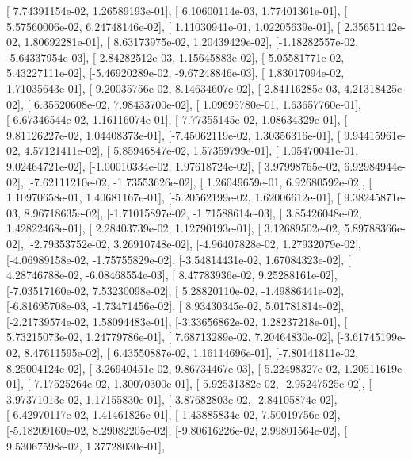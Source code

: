 \documentclass{article}
\begin{document}
       [ 7.74391154e-02,  1.26589193e-01],
       [ 6.10600114e-03,  1.77401361e-01],
       [ 5.57560006e-02,  6.24748146e-02],
       [ 1.11030941e-01,  1.02205639e-01],
       [ 2.35651142e-02,  1.80692281e-01],
       [ 8.63173975e-02,  1.20439429e-02],
       [-1.18282557e-02, -5.64337954e-03],
       [-2.84282512e-03,  1.15645883e-02],
       [-5.05581771e-02,  5.43227111e-02],
       [-5.46920289e-02, -9.67248846e-03],
       [ 1.83017094e-02,  1.71035643e-01],
       [ 9.20035756e-02,  8.14634607e-02],
       [ 2.84116285e-03,  4.21318425e-02],
       [ 6.35520608e-02,  7.98433700e-02],
       [ 1.09695780e-01,  1.63657760e-01],
       [-6.67346544e-02,  1.16116074e-01],
       [ 7.77355145e-02,  1.08634329e-01],
       [ 9.81126227e-02,  1.04408373e-01],
       [-7.45062119e-02,  1.30356316e-01],
       [ 9.94415961e-02,  4.57121411e-02],
       [ 5.85946847e-02,  1.57359799e-01],
       [ 1.05470041e-01,  9.02464721e-02],
       [-1.00010334e-02,  1.97618724e-02],
       [ 3.97998765e-02,  6.92984944e-02],
       [-7.62111210e-02, -1.73553626e-02],
       [ 1.26049659e-01,  6.92680592e-02],
       [ 1.10970658e-01,  1.40681167e-01],
       [-5.20562199e-02,  1.62006612e-01],
       [ 9.38245871e-03,  8.96718635e-02],
       [-1.71015897e-02, -1.71588614e-03],
       [ 3.85426048e-02,  1.42822468e-01],
       [ 2.28403739e-02,  1.12790193e-01],
       [ 3.12689502e-02,  5.89788366e-02],
       [-2.79353752e-02,  3.26910748e-02],
       [-4.96407828e-02,  1.27932079e-02],
       [-4.06989158e-02, -1.75755829e-02],
       [-3.54814431e-02,  1.67084323e-02],
       [ 4.28746788e-02, -6.08468554e-03],
       [ 8.47783936e-02,  9.25288161e-02],
       [-7.03517160e-02,  7.53230098e-02],
       [ 5.28820110e-02, -1.49886441e-02],
       [-6.81695708e-03, -1.73471456e-02],
       [ 8.93430345e-02,  5.01781814e-02],
       [-2.21739574e-02,  1.58094483e-01],
       [-3.33656862e-02,  1.28237218e-01],
       [ 5.73215073e-02,  1.24779786e-01],
       [ 7.68713289e-02,  7.20464830e-02],
       [-3.61745199e-02,  8.47611595e-02],
       [ 6.43550887e-02,  1.16114696e-01],
       [-7.80141811e-02,  8.25004124e-02],
       [ 3.26940451e-02,  9.86734467e-03],
       [ 5.22498327e-02,  1.20511619e-01],
       [ 7.17525264e-02,  1.30070300e-01],
       [ 5.92531382e-02, -2.95247525e-02],
       [ 3.97371013e-02,  1.17155830e-01],
       [-3.87682803e-02, -2.84105874e-02],
       [-6.42970117e-02,  1.41461826e-01],
       [ 1.43885834e-02,  7.50019756e-02],
       [-5.18209160e-02,  8.29082205e-02],
       [-9.80616226e-02,  2.99801564e-02],
       [ 9.53067598e-02,  1.37728030e-01],
\end{document}
